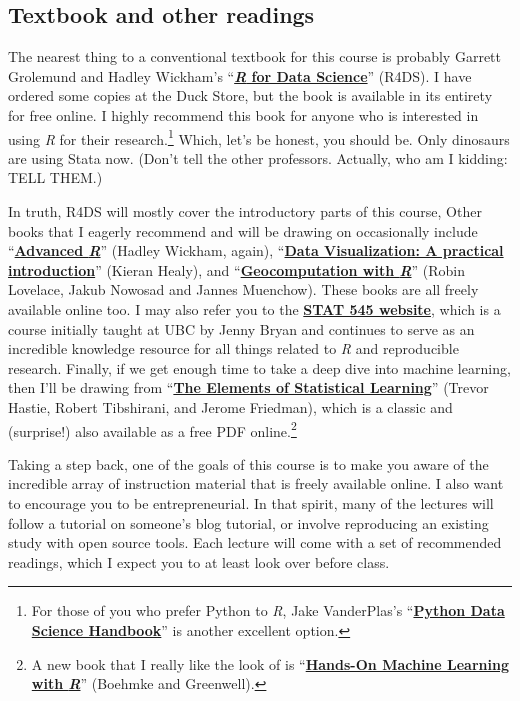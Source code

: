 \documentclass[12]{article}
\begin{document}
\subsection*{Textbook and other readings}

The nearest thing to a conventional textbook for this course is probably Garrett Grolemund and Hadley Wickham's ``\href{http://r4ds.had.co.nz}{\textbf{\textit{R} for Data Science}}'' (R4DS). I have ordered some copies at the Duck Store, but the book is available in its entirety for free online. I highly recommend this book for anyone who is interested in using \textit{R} for their research.\footnote{For those of you who prefer Python to \textit{R}, Jake VanderPlas's ``\href{https://jakevdp.github.io/PythonDataScienceHandbook/}{\textbf{Python Data Science Handbook}}'' is another excellent option.} Which, let's be honest, you should be. Only dinosaurs are using Stata now. (Don't tell the other professors. Actually, who am I kidding: TELL THEM.)

In truth, R4DS will mostly cover the introductory parts of this course, Other books that I eagerly recommend and will be drawing on occasionally include ``\href{https://adv-r.hadley.nz/}{\textbf{Advanced \textit{R}}}'' (Hadley Wickham, again), ``\href{http://socviz.co/}{\textbf{Data Visualization: A practical introduction}}'' (Kieran Healy), and ``\href{https://geocompr.robinlovelace.net/}{\textbf{Geocomputation with \textit{R}}}'' (Robin Lovelace, Jakub Nowosad and Jannes Muenchow). These books are all freely available online too. I may also refer you to the \href{http://stat545.com/topics.html}{\textbf{STAT 545 website}}, which is a course initially taught at UBC by Jenny Bryan and continues to serve as an incredible knowledge resource for all things related to \textit{R} and reproducible research. Finally, if we get enough time to take a deep dive into machine learning, then I'll be drawing from ``\href{https://web.stanford.edu/~hastie/ElemStatLearn/}{\textbf{The Elements of Statistical Learning}}'' (Trevor Hastie, Robert Tibshirani, and Jerome Friedman), which is a classic and (surprise!) also available as a free PDF online.\footnote{A new book that I really like the look of is ``\href{https://bradleyboehmke.github.io/HOML/}{\textbf{Hands-On Machine Learning with \textit{R}}}'' (Boehmke and Greenwell).}

Taking a step back, one of the goals of this course is to make you aware of the incredible array of instruction material that is freely available online. I also want to encourage you to be entrepreneurial. In that spirit, many of the lectures will follow a tutorial on someone's blog tutorial, or involve reproducing an existing study with open source tools. Each lecture will come with a set of recommended readings, which I expect you to at least look over before class.
\end{document}
